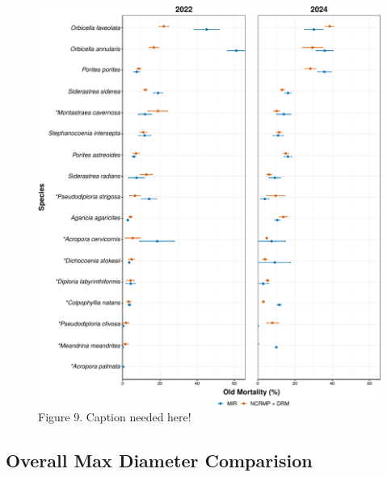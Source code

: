 \documentclass[
]{article}
\begin{document}
\begin{figure}

{\centering \includegraphics{MIR_quarto_files/figure-pdf/overall Old_Mort-1.pdf}

}

\caption{Figure 9. Caption needed here!}

\end{figure}

\hypertarget{overall-max-diameter-comparision}{%
\subsection{Overall Max Diameter
Comparision}\label{overall-max-diameter-comparision}}
\end{document}
